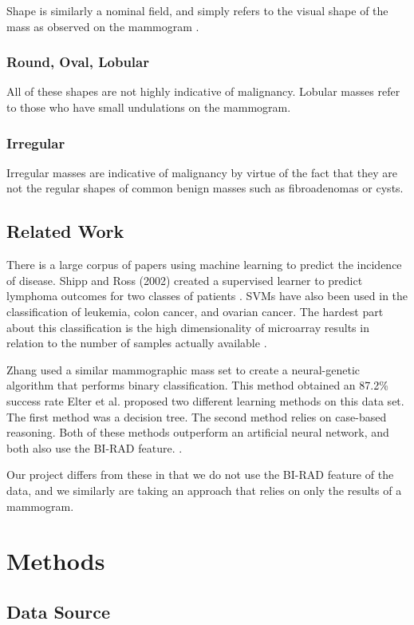 \documentclass[12pt]{article}
\begin{document}
Shape is similarly a nominal field, and simply refers to the visual shape of the mass as observed on the mammogram \cite{barnes}.
\subsubsection{Round, Oval, Lobular}
All of these shapes are not highly indicative of malignancy. Lobular masses refer to those who have small undulations on the mammogram.
\subsubsection{Irregular}
Irregular masses are indicative of malignancy by virtue of the fact that they are not the regular shapes of common benign masses such as fibroadenomas or cysts.

\subsection{Related Work}

There is a large corpus of papers using machine learning to predict the incidence of disease. Shipp and Ross (2002) created a supervised learner to predict lymphoma outcomes for two classes of patients \cite{shipp}. SVMs have also been used in the classification of leukemia, colon cancer, and ovarian cancer. The hardest part about this classification is the high dimensionality of microarray results in relation to the number of samples actually available \cite{review}.

Zhang used a similar mammographic mass set to create a neural-genetic algorithm that performs binary classification. This method obtained an 87.2\% success rate \cite{zhang} Elter et al. proposed two different learning methods on this data set. The first method was a decision tree. The second method relies on case-based reasoning. Both of these methods outperform an artificial neural network, and both also use the BI-RAD feature. \cite{predictionCAD}. 

Our project differs from these in that we do not use the BI-RAD feature of the data, and we similarly are taking an approach that relies on only the results of a mammogram.

\section{Methods}

\subsection{Data Source}
\end{document}
